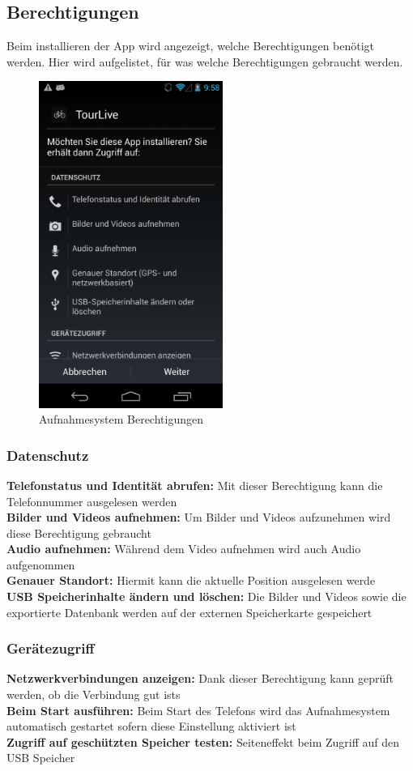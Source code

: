 \subsection{Berechtigungen}
Beim installieren der App wird angezeigt, welche Berechtigungen benötigt werden. Hier wird aufgelistet, für was welche Berechtigungen gebraucht werden.
\begin{figure}[H]
	\centering
	\includegraphics[width=60mm]{images/android/berechtigungen.png}
	\caption{Aufnahmesystem Berechtigungen}
\end{figure}
\subsubsection{Datenschutz}
\textbf{Telefonstatus und Identität abrufen:} Mit dieser Berechtigung kann die Telefonnummer ausgelesen werden\\
\textbf{Bilder und Videos aufnehmen:} Um Bilder und Videos aufzunehmen wird diese Berechtigung gebraucht\\
\textbf{Audio aufnehmen:} Während dem Video aufnehmen wird auch Audio aufgenommen\\
\textbf{Genauer Standort:} Hiermit kann die aktuelle Position ausgelesen werde\\
\textbf{USB Speicherinhalte ändern und löschen:} Die Bilder und Videos sowie die exportierte Datenbank werden auf der externen Speicherkarte gespeichert \\

\subsubsection{Gerätezugriff}
\textbf{Netzwerkverbindungen anzeigen:} Dank dieser Berechtigung kann geprüft werden, ob die Verbindung gut ists \\
\textbf{Beim Start ausführen:} Beim Start des Telefons wird das Aufnahmesystem automatisch gestartet sofern diese Einstellung aktiviert ist \\
\textbf{Zugriff auf geschützten Speicher testen:} Seiteneffekt beim Zugriff auf den USB Speicher

